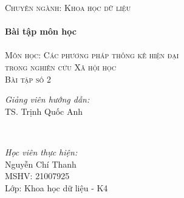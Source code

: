 \documentclass[14pt, a4paper]{article}
\theoremstyle{sltheorem}
\theoremstyle{soltheorem}
\begin{document}
\begin{titlepage}
    \textsc{\Large Chuyên ngành: Khoa học dữ liệu}\\[0.5cm] %



    \HRule \\[0.4cm]
    { \huge \bfseries Bài tập môn học}\\[0.4cm] %
    \HRule \\[1.5cm]

    \textsc{\Large Môn học: Các phương pháp thống kê hiện đại \\ trong nghiên cứu Xã hội học}\\[1cm] %


    \textsc{\Large Bài tập số 2}\\[1cm]


    \begin{minipage}{0.4\textwidth}
        \begin{flushleft} \large
        \emph{Giảng viên hướng dẫn:} \\
        TS. Trịnh Quốc Anh %
        \end{flushleft}
    \end{minipage}\\[0.5cm]

    \begin{minipage}{0.4\textwidth}
    \begin{flushleft} \large
    \emph{Học viên thực hiện:}\\
    Nguyễn Chí Thanh \\
    MSHV: 21007925 \\ %
    Lớp: Khoa học dữ liệu - K4
    \end{flushleft}
    \end{minipage}




\end{titlepage}
\end{document}
